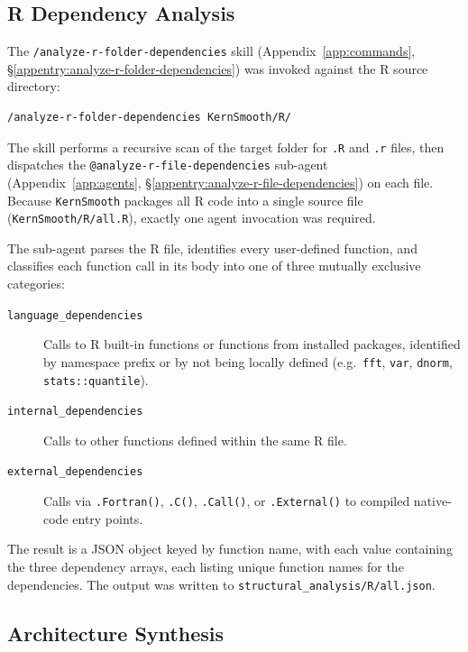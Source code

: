 \documentclass[12pt,a4paper]{article}
\begin{document}
\subsection{R Dependency Analysis}

The \texttt{/analyze-r-folder-dependencies} skill (Appendix~\ref{app:commands}, \S\ref{appentry:analyze-r-folder-dependencies}) was invoked against the R source directory:

\begin{lstlisting}[style=shell]
/analyze-r-folder-dependencies KernSmooth/R/
\end{lstlisting}

The skill performs a recursive scan of the target folder for \texttt{.R} and \texttt{.r} files, then dispatches the \texttt{@analyze-r-file-dependencies} sub-agent (Appendix~\ref{app:agents}, \S\ref{appentry:analyze-r-file-dependencies}) on each file. Because \texttt{KernSmooth} packages all R code into a single source file (\texttt{KernSmooth/R/all.R}), exactly one agent invocation was required.

The sub-agent parses the R file, identifies every user-defined function, and classifies each function call in its body into one of three mutually exclusive categories:

\begin{description}
  \item[\texttt{language\_dependencies}] Calls to R built-in functions or functions from installed packages, identified by namespace prefix or by not being locally defined (e.g.\ \texttt{fft}, \texttt{var}, \texttt{dnorm}, \texttt{stats::quantile}).
  \item[\texttt{internal\_dependencies}] Calls to other functions defined within the same R file.
  \item[\texttt{external\_dependencies}] Calls via \texttt{.Fortran()}, \texttt{.C()}, \texttt{.Call()}, or \texttt{.External()} to compiled native-code entry points.
\end{description}

The result is a JSON object keyed by function name, with each value containing the three dependency arrays, each listing unique function names for the dependencies. The output was written to \texttt{structural\_analysis/R/all.json}.

\subsection{Architecture Synthesis}
\end{document}

